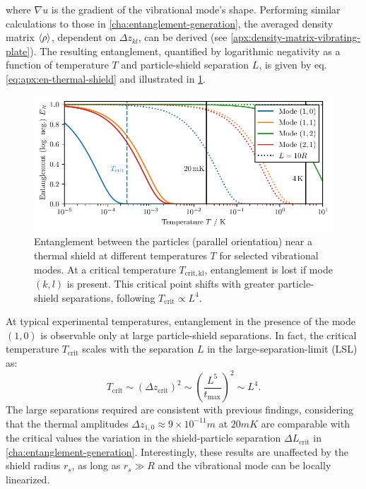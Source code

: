 where $\nabla u$ is the gradient of the vibrational mode's shape.
Performing similar calculations to those in \cref{cha:entanglement-generation}, the averaged density matrix $\left\langle\rho\right\rangle$, dependent on $\Delta z_{kl}$, can be derived (see \cref{apx:density-matrix-vibrating-plate}).
The resulting entanglement, quantified by logarithmic negativity as a function of temperature $T$ and particle-shield separation $L$, is given by eq. \eqref{eq:apx:en-thermal-shield} and illustrated in \cref{fig:5:entanglement-temperature}.
\begin{figure}[!htbp]
  \centering
  \includegraphics[width=\textwidth]{./../figures/vibrations/log-neg-shield-vibrations-T.pdf}
  \caption{Entanglement between the particles (parallel orientation) near a thermal shield at different temperatures $T$ for selected vibrational modes. At a critical temperature $T_\mathrm{crit,kl}$, entanglement is lost if mode $(k, l)$ is present. This critical point shifts with greater particle-shield separations, following $T_\mathrm{crit} \propto L^4$.}
  \label{fig:5:entanglement-temperature}
\end{figure}
At typical experimental temperatures, entanglement in the presence of the mode $(1,0)$ is observable only at large particle-shield separations.
In fact, the critical temperature $T_\mathrm{crit}$ scales with the separation $L$ in the large-separation-limit (LSL) as:
\begin{equation}
  T_\mathrm{crit} \sim (\Delta z_\mathrm{crit})^2 \sim \left(\frac{L^5}{t_\mathrm{max}} \right)^2 \sim L^4 .
\end{equation}
The large separations required are consistent with previous findings, considering that the thermal amplitudes $\Delta z_{1,0} \approx 9 \times 10^{-11}\si{m}$ at $20\si{mK}$ are comparable with the critical values the variation in the shield-particle separation $\Delta L_\mathrm{crit}$ in \cref{cha:entanglement-generation}.
Interestingly, these results are unaffected by the shield radius $r_s$, as long as $r_s \gg R$ and the vibrational mode can be locally linearized.
